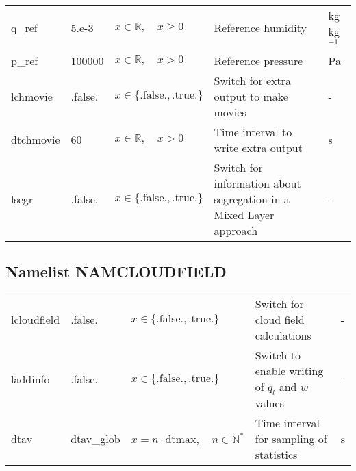 \documentclass[twoside,11pt,fleqn,a4paper,english,openright]{report}
\begin{document}
\begin{center}
\begin{supertabular}{|l|p{1.6cm}|p{4cm}|p{6cm}|l|}
  q\_ref	& 5.e-3 & $x \in \mathbb{R}, \quad x \ge 0$	&  Reference humidity & kg kg$^{-1}$\\
  p\_ref & 100000 & $x \in \mathbb{R}, \quad x > 0$&  Reference pressure & Pa\\
  lchmovie & .false. &  $x\in\{\text{.false.},\text{.true.}\}$ & Switch for extra output to make movies & -\\
  dtchmovie & 60& $x \in \mathbb{R}, \quad x > 0$& Time interval to write extra output & s\\
  lsegr & .false. & $x\in\{\text{.false.},\text{.true.}\}$ & Switch for information about segregation in a Mixed Layer approach & -\\
\end{supertabular}
\end{center}

\subsection{Namelist NAMCLOUDFIELD}\label{par:cloudfield}

\begin{center}
  \tablelasttail{
        &&&&\\\hline
  }
\begin{supertabular}{|l|p{1.6cm}|p{4cm}|p{6cm}|l|}
  lcloudfield	& .false.	& $x\in\{\text{.false.},\text{.true.}\}$	& Switch for cloud field calculations		& -\\
  laddinfo	& .false.	& $x\in\{\text{.false.},\text{.true.}\}$	& Switch to enable writing of $q_l$ and $w$ values	& -\\
  dtav		& dtav\_glob	& $x = n \cdot \text{dtmax}, \quad n \in \mathbb{N}^*$	& Time interval for sampling of statistics	& s\\
\end{supertabular}
\end{center}
\end{document}
